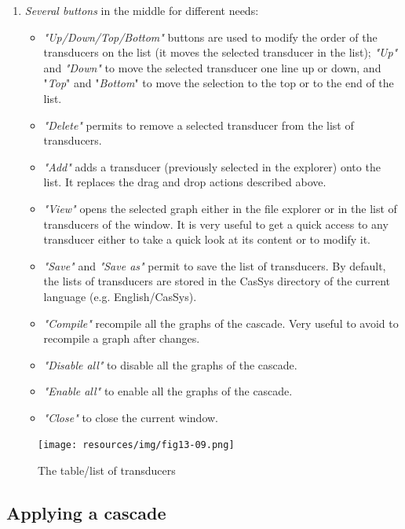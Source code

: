\begin{enumerate}
	\item \textit{Several buttons} in the middle for different needs: 
		\begin{itemize}
			\item \textit{"Up/Down/Top/Bottom"} buttons are used to modify the order of the transducers on the list (it moves the selected transducer in the list); 
			\textit{"Up"} and \textit{"Down"} to move the selected transducer one line up or down, and "\textit{Top}" and "\textit{Bottom}" to move the selection to the top or to the end of the list.
			\item  \textit{"Delete"} permits to remove a selected transducer from the list of transducers. 
			\item		\textit{"Add"} adds a transducer (previously selected in the explorer) onto the list. It replaces the drag and drop actions described above. 
			\item \textit{"View"} opens the selected graph either in the file explorer or in the list of transducers of the window. It is very useful to get a quick access to any transducer either to take a quick look at its content or to modify it.
			\item \textit{"Save"} and \textit{"Save as"} permit to save the list of transducers. By default, the lists of transducers are stored in the CasSys directory of the current language (e.g. English/CasSys).
			\item \textit{"Compile"} recompile all the graphs of the cascade. Very useful to avoid to recompile a graph after changes.
			\item \textit{"Disable all"} to disable all the graphs of the cascade. 
			\item \textit{"Enable all"} to enable all the graphs of the cascade. 
			\item \textit{"Close"} to close the current window.
		\end{itemize}
\end{enumerate}

\begin{figure}[!htb]
  \centering
  \texttt{[image: resources/img/fig13-09.png]}
  \caption{The table/list of transducers}
  \label{fig13-09}
\end{figure}

	
\subsection{Applying a cascade}
\label{subsec:launchCascade}

